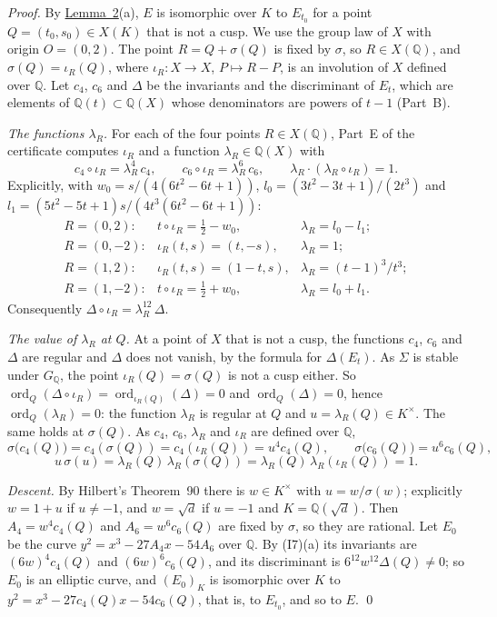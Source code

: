 \documentclass[11pt]{article}
\newcommand{\Q}{\mathbb Q}
\DeclareMathOperator{\ord}{ord}
\begin{document}
\emph{Proof.} By \hyperref[lemma-curve]{Lemma~2}(a), \(E\) is isomorphic over \(K\) to \(E_{t_0}\) for a point
\(Q=(t_0,s_0)\in X(K)\) that is not a cusp. We use the group law of \(X\) with origin \(O=(0,2)\). The point
\(R=Q+\sigma(Q)\) is fixed by \(\sigma\), so \(R\in X(\Q)\), and \(\sigma(Q)=\iota_R(Q)\), where
\(\iota_R\colon X\to X\), \(P\mapsto R-P\), is an involution of \(X\) defined over \(\Q\). Let \(c_4\), \(c_6\)
and \(\Delta\) be the invariants and the discriminant of \(E_t\), which are elements of \(\Q(t)\subset\Q(X)\) whose
denominators are powers of \(t-1\) (Part~B).

\emph{The functions \(\lambda_R\).} For each of the four points \(R\in X(\Q)\), Part~E of the certificate computes
\(\iota_R\) and a function \(\lambda_R\in\Q(X)\) with
\[c_4\circ\iota_R=\lambda_R^4\,c_4,\qquad c_6\circ\iota_R=\lambda_R^6\,c_6,\qquad
\lambda_R\cdot(\lambda_R\circ\iota_R)=1.\]
Explicitly, with \(w_0=s/(4(6t^2-6t+1))\), \(l_0=(3t^2-3t+1)/(2t^3)\) and
\(l_1=(5t^2-5t+1)s/(4t^3(6t^2-6t+1))\):
\[\begin{array}{lll}
R=(0,2)\colon & t\circ\iota_R=\tfrac12-w_0, & \lambda_R=l_0-l_1;\\[2pt]
R=(0,-2)\colon & \iota_R(t,s)=(t,-s), & \lambda_R=1;\\[2pt]
R=(1,2)\colon & \iota_R(t,s)=(1-t,s), & \lambda_R=(t-1)^3/t^3;\\[2pt]
R=(1,-2)\colon & t\circ\iota_R=\tfrac12+w_0, & \lambda_R=l_0+l_1.
\end{array}\]
Consequently \(\Delta\circ\iota_R=\lambda_R^{12}\,\Delta\).

\emph{The value of \(\lambda_R\) at \(Q\).} At a point of \(X\) that is not a cusp, the functions \(c_4\), \(c_6\)
and \(\Delta\) are regular and \(\Delta\) does not vanish, by the formula for \(\Delta(E_t)\). As \(\Sigma\) is
stable under \(G_{\Q}\), the point \(\iota_R(Q)=\sigma(Q)\) is not a cusp either. So
\(\ord_Q(\Delta\circ\iota_R)=\ord_{\iota_R(Q)}(\Delta)=0\) and \(\ord_Q(\Delta)=0\), hence
\(\ord_Q(\lambda_R)=0\): the function \(\lambda_R\) is regular at \(Q\) and \(u=\lambda_R(Q)\in K^\times\).
The same holds at \(\sigma(Q)\). As \(c_4\), \(c_6\), \(\lambda_R\) and \(\iota_R\) are defined over \(\Q\),
\[\sigma\bigl(c_4(Q)\bigr)=c_4(\sigma(Q))=c_4(\iota_R(Q))=u^4c_4(Q),\qquad
\sigma\bigl(c_6(Q)\bigr)=u^6c_6(Q),\]
\[u\,\sigma(u)=\lambda_R(Q)\,\lambda_R(\sigma(Q))=\lambda_R(Q)\,\lambda_R(\iota_R(Q))=1.\]

\emph{Descent.} By Hilbert's Theorem~90 there is \(w\in K^\times\) with \(u=w/\sigma(w)\); explicitly \(w=1+u\) if
\(u\neq-1\), and \(w=\sqrt d\) if \(u=-1\) and \(K=\Q(\sqrt d)\). Then \(A_4=w^4c_4(Q)\) and \(A_6=w^6c_6(Q)\) are
fixed by \(\sigma\), so they are rational. Let \(E_0\) be the curve \(y^2=x^3-27A_4x-54A_6\) over \(\Q\). By
(I7)(a) its invariants are \((6w)^4c_4(Q)\) and \((6w)^6c_6(Q)\), and its discriminant is
\(6^{12}w^{12}\Delta(Q)\neq0\); so \(E_0\) is an elliptic curve, and \((E_0)_K\) is isomorphic over \(K\) to
\(y^2=x^3-27c_4(Q)x-54c_6(Q)\), that is, to \(E_{t_0}\), and so to \(E\). \qed
\end{document}

